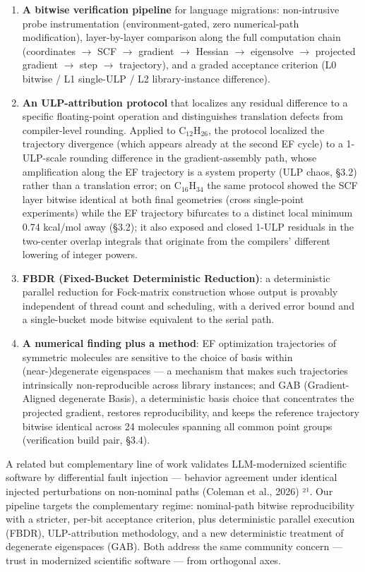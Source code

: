 \documentclass[preprint,12pt]{elsarticle}
\begin{document}
\begin{enumerate}
\item \textbf{A bitwise verification pipeline} for language migrations: non-intrusive probe instrumentation (environment-gated, zero numerical-path modification), layer-by-layer comparison along the full computation chain (coordinates $\rightarrow$ SCF $\rightarrow$ gradient $\rightarrow$ Hessian $\rightarrow$ eigensolve $\rightarrow$ projected gradient $\rightarrow$ step $\rightarrow$ trajectory), and a graded acceptance criterion (L0 bitwise / L1 single-ULP / L2 library-instance difference).
\item \textbf{An ULP-attribution protocol} that localizes any residual difference to a specific floating-point operation and distinguishes translation defects from compiler-level rounding. Applied to C$_{12}$H$_{26}$, the protocol localized the trajectory divergence (which appears already at the second EF cycle) to a 1-ULP-scale rounding difference in the gradient-assembly path, whose amplification along the EF trajectory is a system property (ULP chaos, \S{}3.2) rather than a translation error; on C$_{16}$H$_{34}$ the same protocol showed the SCF layer bitwise identical at both final geometries (cross single-point experiments) while the EF trajectory bifurcates to a distinct local minimum 0.74 kcal/mol away (\S{}3.2); it also exposed and closed 1-ULP residuals in the two-center overlap integrals that originate from the compilers' different lowering of integer powers.
\item \textbf{FBDR (Fixed-Bucket Deterministic Reduction)}: a deterministic parallel reduction for Fock-matrix construction whose output is provably independent of thread count and scheduling, with a derived error bound and a single-bucket mode bitwise equivalent to the serial path.
\item \textbf{A numerical finding plus a method}: EF optimization trajectories of symmetric molecules are sensitive to the choice of basis within (near-)degenerate eigenspaces --- a mechanism that makes such trajectories intrinsically non-reproducible across library instances; and GAB (Gradient-Aligned degenerate Basis), a deterministic basis choice that concentrates the projected gradient, restores reproducibility, and keeps the reference trajectory bitwise identical across 24 molecules spanning all common point groups (verification build pair, \S{}3.4).
\end{enumerate}

A related but complementary line of work validates LLM-modernized scientific software by differential fault injection --- behavior agreement under identical injected perturbations on non-nominal paths (Coleman et al., 2026) ²¹. Our pipeline targets the complementary regime: nominal-path bitwise reproducibility with a stricter, per-bit acceptance criterion, plus deterministic parallel execution (FBDR), ULP-attribution methodology, and a new deterministic treatment of degenerate eigenspaces (GAB). Both address the same community concern --- trust in modernized scientific software --- from orthogonal axes.
\end{document}

